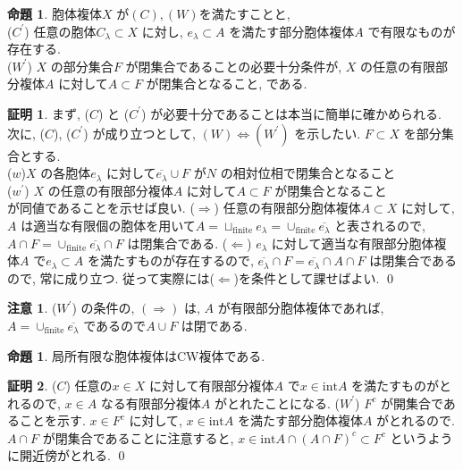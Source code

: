 \documentclass[10pt, fleqn, label-section=none]{bxjsarticle}
\theoremstyle{definition}
\newtheorem{prop}[dfn]{命題}
\newtheorem*{pf*}{証明}
\newtheorem{remark}[dfn]{注意}
\newcommand{\LR}{\Leftrightarrow}
\newcommand{\naraba}{\Rightarrow}
\newcommand{\gyaku}{\Leftarrow}
\renewcommand{\;}{\, ; \,}
\begin{document}
\begin{prop} 胞体複体$X$ が$(C), (W)$を満たすことと,  \\
($C^\prime$) 任意の胞体$C_\lambda \subset X$ に対し, $e_\lambda \subset A$ を満たす部分胞体複体$A$ で有限なものが存在する. \\
($W^\prime$) $X$ の部分集合$F$ が閉集合であることの必要十分条件が, $X$ の任意の有限部分複体$A$ に対して$A \subset F$ が閉集合となること, である. 
\end{prop}
\begin{pf*}
まず, ($C$) と ($C^\prime$) が必要十分であることは本当に簡単に確かめられる. 次に, ($C$), ($C^\prime$) が成り立つとして, $(W) \LR (W^\prime)$ を示したい. $F\subset X$ を部分集合とする.  \\
($w$)$X$ の各胞体$e_\lambda$ に対して$\overline{e_\lambda} \cup F$ が$N$ の相対位相で閉集合となること\\
($w^\prime$) $X$ の任意の有限部分複体$A$ に対して$A \subset F$ が閉集合となること \\
が同値であることを示せば良い. ($\naraba$)
任意の有限部分胞体複体$A \subset X$ に対して, $A$ は適当な有限個の胞体を用いて$A = \sqcup_{\textrm{finite}} e_\lambda = \cup _{\textrm{finite}} \overline{e_\lambda}$ と表されるので, $A \cap F = \cup _{\textrm{finite}} \overline{e_\lambda} \cap F  $ は閉集合である. ($\gyaku$) $e_\lambda$ に対して適当な有限部分胞体複体$A$ で$e_\lambda \subset A$ を満たすものが存在するので, $\overline{e_\lambda} \cap F =\overline{e_\lambda} \cap A \cap F$ は閉集合であるので, 常に成り立つ. 従って実際には($\gyaku$)を条件として課せばよい. 
\qed
\end{pf*}

\begin{remark}
($W^\prime$) の条件の, $(\naraba)$ は, $A$ が有限部分胞体複体であれば, $A = \cup_{\textrm{finite}} \overline{e_\lambda} $ であるので$A \cup F$ は閉である. 
\end{remark}


\begin{prop}
局所有限な胞体複体はCW複体である.
\end{prop}
\begin{pf*}
($C$) 任意の$x \in X$ に対して有限部分複体$A$ で$x \in \textrm{int} A$ を満たすものがとれるので, $x \in A$ なる有限部分複体$A$ がとれたことになる. ($W^\prime$) $F^c$ が開集合であることを示す.  $x \in F^c$ に対して, $x \in \textrm{int} A$ を満たす部分胞体複体$A$ がとれるので. $A \cap F$ が閉集合であることに注意すると, $x \in  \textrm{int} A \cap (A \cap F)^c \subset F^c$ というように開近傍がとれる. 
\qed
\end{pf*}
\end{document}
